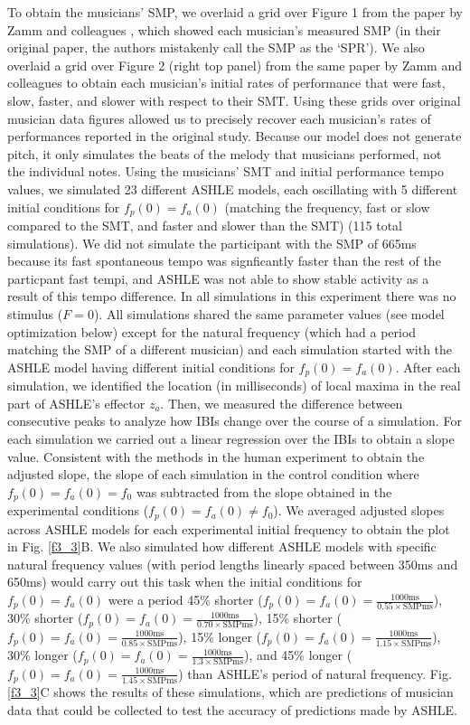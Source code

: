 \documentclass{report}
\begin{document}
To obtain the musicians' SMP, we overlaid a grid over Figure 1 from the paper by Zamm and colleagues \cite{zamm2018musicians}, which showed each musician's measured SMP (in their original paper, the authors mistakenly call the SMP as the `SPR'). We also overlaid a grid over Figure 2 (right top panel) from the same paper by Zamm and colleagues to obtain each musician's initial rates of performance that were fast, slow, faster, and slower with respect to their SMT. Using these grids over original musician data figures allowed us to precisely recover each musician's rates of performances reported in the original study. Because our model does not generate pitch, it only simulates the beats of the melody that musicians performed, not the individual notes. Using the musicians' SMT and initial performance tempo values, we simulated 23 different ASHLE models, each oscillating with 5 different initial conditions for $f_p(0)=f_a(0)$ (matching the frequency, fast or slow compared to the SMT, and faster and slower than the SMT) (115 total simulations). We did not simulate the participant with the SMP of 665ms because its fast spontaneous tempo was signficantly faster than the rest of the particpant fast tempi, and ASHLE was not able to show stable activity as a result of this tempo difference. In all simulations in this experiment there was no stimulus ($F = 0$). All simulations shared the same parameter values (see model optimization below) except for the natural frequency (which had a period matching the SMP of a different musician) and each simulation started with the ASHLE model having different initial conditions for $f_p(0)=f_a(0)$. After each simulation, we identified the location (in milliseconds) of local maxima in the real part of ASHLE's effector $z_a$. Then, we measured the difference between consecutive peaks to analyze how IBIs change over the course of a simulation. For each simulation we carried out a linear regression over the IBIs to obtain a slope value. Consistent with the methods in the human experiment to obtain the adjusted slope, the slope of each simulation in the control condition where $f_p(0)=f_a(0)=f_0$ was subtracted from the slope obtained in the experimental conditions ($f_p(0)=f_a(0)\neq f_0$). We averaged adjusted slopes across ASHLE models for each experimental initial frequency to obtain the plot in Fig.{} \ref{f3_3}B. We also simulated how different ASHLE models with specific natural frequency values (with period lengths linearly spaced between 350ms and 650ms) would carry out this task when the initial conditions for $f_p(0)=f_a(0)$ were a period 45\% shorter ($f_p(0)=f_a(0)=\frac{1000\text{ms}}{0.55 \times \text{SMPms}}$), 30\% shorter ($f_p(0)=f_a(0)=\frac{1000\text{ms}}{0.70 \times \text{SMPms}}$), 15\% shorter ($f_p(0)=f_a(0)=\frac{1000\text{ms}}{0.85 \times \text{SMPms}}$), 15\% longer ($f_p(0)=f_a(0)=\frac{1000\text{ms}}{1.15 \times \text{SMPms}}$), 30\% longer ($f_p(0)=f_a(0)=\frac{1000\text{ms}}{1.3 \times \text{SMPms}}$), and 45\% longer ($f_p(0)=f_a(0)=\frac{1000\text{ms}}{1.45 \times \text{SMPms}}$) than ASHLE's period of natural frequency. Fig.{} \ref{f3_3}C shows the results of these simulations, which are predictions of musician data that could be collected to test the accuracy of predictions made by ASHLE.
\end{document}
